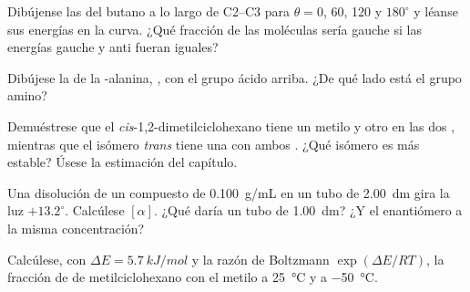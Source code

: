\begin{exercise}[$\star\star$]\label{exo:b1:stereochemistry-in-depth:5}
Dibújense las  del butano a lo largo de C2--C3 para
$\theta = 0$, 60, 120 y $180^\circ$ y léanse sus energías en la curva.
¿Qué fracción de las moléculas sería gauche si las energías gauche y anti
fueran iguales?
\end{exercise}

\begin{exercise}[$\star\star$]\label{exo:b1:stereochemistry-in-depth:6}
Dibújese la  de la -alanina,
, con el grupo ácido arriba. ¿De qué lado está el
grupo amino?
\end{exercise}

\begin{exercise}[$\star\star$]\label{exo:b1:stereochemistry-in-depth:7}
Demuéstrese que el \textit{cis}-1,2-dimetilciclohexano tiene un metilo
 y otro  en las dos , mientras que el isómero
\textit{trans} tiene una  con ambos . ¿Qué isómero es
más estable? Úsese la estimación del capítulo.
\end{exercise}

\begin{exercise}[$\star\star$]\label{exo:b1:stereochemistry-in-depth:8}
Una disolución de un compuesto  de \qty{0.100}{g/mL} en un tubo de
\qty{2.00}{dm} gira la luz $+13.2^\circ$. Calcúlese $[\alpha]$. ¿Qué daría
un tubo de \qty{1.00}{dm}? ¿Y el enantiómero a la misma concentración?
\end{exercise}

\begin{exercise}[$\star\star$]\label{exo:b1:stereochemistry-in-depth:9}
Calcúlese, con $\Delta E = \qty{5.7}{kJ/mol}$ y la razón de Boltzmann
$\exp(\Delta E/RT)$, la fracción de  de metilciclohexano con el
metilo  a \qty{25}{\celsius} y a \qty{-50}{\celsius}.
\end{exercise}

